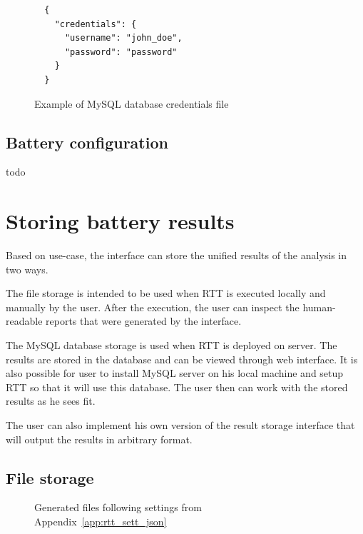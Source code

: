 \documentclass[
  digital,  	%
  color,		%
  oneside,   	%
  12pt,
  nocover,
  notable,
  nolof,
  nolot,
]{fithesis3}
\begin{document}
\begin{figure}[h!]
\begin{verbatim}
  {
    "credentials": {
      "username": "john_doe",
      "password": "password"    
    }  
  }
\end{verbatim}
\caption{Example of MySQL database credentials file}
\label{fig:mysql_credentials}
\end{figure}

\subsection{Battery configuration}
\begin{huge}
todo
\end{huge}

\section{Storing battery results}
\label{sec:result_storages}
Based on use-case, the interface can store the unified results of the analysis in two ways. 

The file storage is intended to be used when RTT is executed locally and manually by the user. After the execution, the user can inspect the human-readable reports that were generated by the interface. 

The MySQL database storage is used when RTT is deployed on server. The results are stored in the database and can be viewed through web interface. It is also possible for user to install MySQL server on his local machine and setup RTT so that it will use this database. The user then can work with the stored results as he sees fit.

The user can also implement his own version of the result storage interface that will output the results in arbitrary format. 

\subsection{File storage}
\label{sec:file_res_storage}
\begin{figure}[h!]
\centering
{}
\caption{Generated files following settings from Appendix~\ref{app:rtt_sett_json}}
\label{fig:files_generated}
\end{figure}
\end{document}
